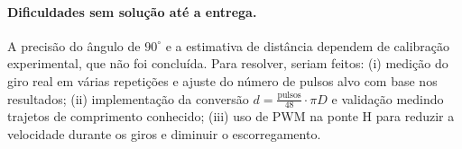 \paragraph{Dificuldades sem solução até a entrega.}
A precisão do ângulo de $90^\circ$ e a estimativa de distância dependem de calibração experimental,
que não foi concluída. Para resolver, seriam feitos: (i) medição do giro real em várias repetições e
ajuste do número de pulsos alvo com base nos resultados; (ii) implementação da conversão
$d = \frac{\text{pulsos}}{48}\cdot \pi D$ e validação medindo trajetos de comprimento conhecido;
(iii) uso de PWM na ponte H para reduzir a velocidade durante os giros e diminuir o escorregamento.
